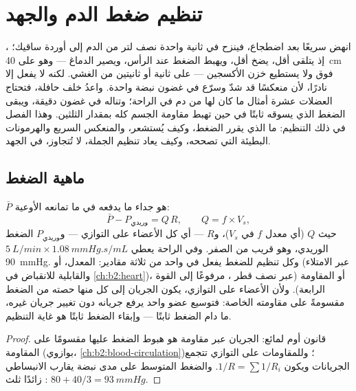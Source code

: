 \chapter{تنظيم ضغط الدم والجهد}\label{ch:b2:blood-pressure}

انهض سريعًا بعد اضطجاع، فينزح في ثانية واحدة نصف لتر من
الدم إلى أوردة ساقيك؛ ، إذ يتلقى أقل، يضخ أقل،
ويهبط الضغط عند الرأس، ويصير الدماغ --- وهو على \qty{40}{cm} فوق
 ولا يستطيع خزن الأكسجين --- على ثانية أو
ثانيتين من الغشي. لكنه لا يفعل إلا نادرًا، لأن منعكسًا قد
شدّ  وسرّع  في غضون نبضة واحدة. واعدُ خلف
حافلة، فتحتاج العضلات عشرة أمثال ما كان لها من دم في الراحة؛
وتناله في غضون دقيقة، ويبقى الضغط الذي يسوقه
ثابتًا في حين تهبط مقاومة الجسم كله بمقدار
الثلثين. وهذا الفصل في ذلك التنظيم: ما الذي يقرر
الضغط، وكيف يُستشعر، والمنعكس السريع والهرمونات البطيئة
التي تصححه، وكيف يعاد تنظيم الجملة، لا تُتجاوز،
في الجهد.

\section{ماهية الضغط}

\begin{theorem}\label{thm:b2:blood-pressure:equation}
 $\bar P$ هو جداء ما يدفعه 
في ما تمانعه الأوعية:
\[
\bar P - P_{\text{وريدي}} = Q\,R, \qquad Q = f\times V_s,
\]
حيث $Q$  (أي معدل  $f$ في 
$V_s$)، و$R$  --- أي  كل
الأعضاء على التوازي --- و$P_{\text{وريدي}}$ الضغط الوريدي،
وهو قريب من الصفر. وفي الراحة يعطي $\qty{5}{L/min}\times\qty{1.08}{mmHg.s/mL}$
\qty{90}{mmHg}. وكل تنظيم للضغط يفعل في واحد من ثلاثة
مقادير: المعدل، أو  (عبر الامتلاء والقابلية
للانقباض في \cref{ch:b2:heart})، أو المقاومة (عبر
نصف قطر ، مرفوعًا إلى القوة الرابعة). ولأن الأعضاء على
التوازي، يكون الجريان إلى كل منها حصته من الضغط مقسومةً على
مقاومته الخاصة: فتوسيع  عضو واحد يرفع
جريانه دون تغيير جريان غيره، ما دام الضغط ثابتًا ---
وإبقاء الضغط ثابتًا هو غاية التنظيم.
\end{theorem}
\begin{proof}
قانون أوم لمائع: الجريان عبر مقاومة هو هبوط الضغط
عليها مقسومًا على المقاومة (بوازوي،
\cref{ch:b2:blood-circulation})؛ وللمقاومات على التوازي
تتجمع الجريانات ويكون $1/R = \sum 1/R_i$. والضغط المتوسط على مدى نبضة
يقارب الانبساطي زائدًا ثلث :
$80 + 40/3 = \qty{93}{mmHg}$.
\end{proof}

